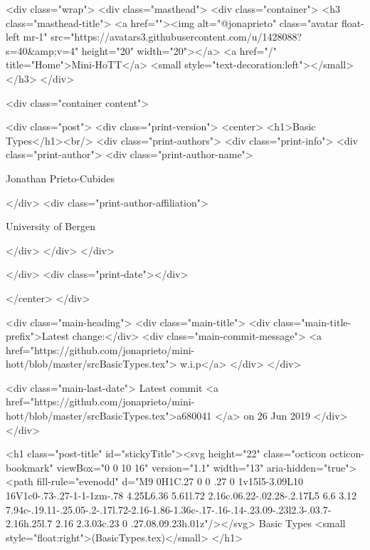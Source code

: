     <div class="wrap">
      <div class="masthead">
        <div class="container">
          <h3 class="masthead-title">
            <a href=""><img alt="@jonaprieto" class="avatar float-left mr-1" src="https://avatars3.githubusercontent.com/u/1428088?s=40&amp;v=4" height="20" width="20"></a>
            <a href="/" title="Home">Mini-HoTT</a>
            <small style="text-decoration:left"></small>
          </h3>
        </div>
      
      <div class="container content">
        







<div class="post">
  <div class="print-version">
    <center>
      <h1>Basic Types</h1><br/>
        <div class="print-authors">
          <div class="print-info">
            <div class="print-author">
              <div class="print-author-name">
                
                  Jonathan Prieto-Cubides
                
              </div>
              <div class="print-author-affiliation">
                
                  University of Bergen
                
                </div>
            </div>
          </div>
          
          
        </div>
        <div class="print-date"></div>
        
        
    </center>
  </div>

  
  <div class="main-heading">
    <div class="main-title">
      <div class="main-title-prefix">Latest change:</div>
      <div class="main-commit-message">
            <a href="https://github.com/jonaprieto/mini-hott/blob/master/srcBasicTypes.tex">
              w.i.p</a>
      </div>
    </div>

    <div class="main-last-date">
      Latest commit <a href="https://github.com/jonaprieto/mini-hott/blob/master/srcBasicTypes.tex">a680041 </a> on  26 Jun 2019
    </div>
  </div>
  

  <h1 class="post-title" id="stickyTitle"><svg height="22" class="octicon octicon-bookmark" viewBox="0 0 10 16" version="1.1" width="13" aria-hidden="true"><path fill-rule="evenodd" d="M9 0H1C.27 0 0 .27 0 1v15l5-3.09L10 16V1c0-.73-.27-1-1-1zm-.78 4.25L6.36 5.61l.72 2.16c.06.22-.02.28-.2.17L5 6.6 3.12 7.94c-.19.11-.25.05-.2-.17l.72-2.16-1.86-1.36c-.17-.16-.14-.23.09-.23l2.3-.03.7-2.16h.25l.7 2.16 2.3.03c.23 0 .27.08.09.23h.01z"/></svg> Basic Types <small style="float:right">(BasicTypes.tex)</small>
  </h1>

